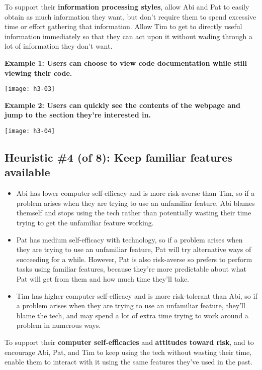 \noindent To support their \textbf{information processing styles}, allow Abi and Pat to easily obtain as much information they want, but don't require them to spend excessive time or effort gathering that information. Allow Tim to get to directly useful information immediately so that they can act upon it without wading through a lot of information they don’t want.

\spacer
\noindent\textbf{Example 1: Users can choose to view code documentation while still viewing their code.}
\begin{center}
\noindent\texttt{[image: h3-03]}
\end{center}

\noindent\textbf{Example 2: Users can quickly see the contents of the webpage and jump to the section they're interested in.}
\begin{center}
\noindent\texttt{[image: h3-04]}
\end{center}

\subsection{Heuristic \#4 (of 8): Keep familiar features available}

\begin{itemize}
\item Abi has lower computer self-efficacy and is more risk-averse than Tim, so if a problem arises when they are trying to use an unfamiliar feature, Abi blames themself and stops using the tech rather than potentially wasting their time trying to get the unfamiliar feature working.
\item Pat has medium self-efficacy with technology, so if a problem arises when they are trying to use an unfamiliar feature, Pat will try alternative ways of succeeding for a while. However, Pat is also risk-averse so prefers to perform tasks using familiar features, because they're more predictable about what Pat will get from them and how much time they'll take.
\item Tim has higher computer self-efficacy and is more risk-tolerant than Abi, so if a problem arises when they are trying to use an unfamiliar feature, they’ll blame the tech, and may spend a lot of extra time trying to work around a problem in numerous ways.
\end{itemize}

\noindent To support their \textbf{computer self-efficacies} and \textbf{attitudes toward risk}, and to encourage Abi, Pat, and Tim to keep using the tech without wasting their time, enable them to interact with it using the same features they’ve used in the past.

